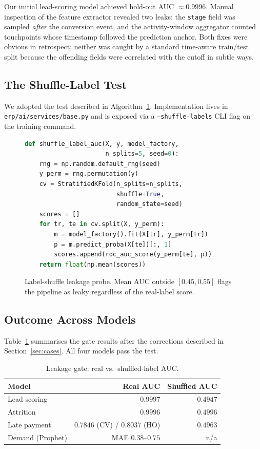 \documentclass[conference]{IEEEtran}
\begin{document}
Our initial lead-scoring model achieved hold-out AUC $\approx 0.9996$. Manual
inspection of the feature extractor revealed two leaks: the \texttt{stage}
field was sampled \emph{after} the conversion event, and the activity-window
aggregator counted touchpoints whose timestamp followed the prediction
anchor. Both fixes were obvious in retrospect; neither was caught by a
standard time-aware train/test split because the offending fields were
correlated with the cutoff in subtle ways.

\subsection{The Shuffle-Label Test}

We adopted the test described in Algorithm~\ref{alg:shuffle}.
Implementation lives in \texttt{erp/ai/services/base.py} and is exposed via a
\texttt{--shuffle-labels} CLI flag on the training command.

\begin{figure}[h]
\begin{lstlisting}[language=Python]
def shuffle_label_auc(X, y, model_factory,
                      n_splits=5, seed=0):
    rng = np.random.default_rng(seed)
    y_perm = rng.permutation(y)
    cv = StratifiedKFold(n_splits=n_splits,
                         shuffle=True,
                         random_state=seed)
    scores = []
    for tr, te in cv.split(X, y_perm):
        m = model_factory().fit(X[tr], y_perm[tr])
        p = m.predict_proba(X[te])[:, 1]
        scores.append(roc_auc_score(y_perm[te], p))
    return float(np.mean(scores))
\end{lstlisting}
\caption{Label-shuffle leakage probe. Mean AUC outside $[0.45, 0.55]$ flags
the pipeline as leaky regardless of the real-label score.}
\label{alg:shuffle}
\end{figure}

\subsection{Outcome Across Models}

Table~\ref{tab:shuffle} summarises the gate results after the corrections
described in Section~\ref{sec:cases}. All four models pass the test.

\begin{table}[h]
\centering
\caption{Leakage gate: real vs.\ shuffled-label AUC.}
\label{tab:shuffle}
\begin{tabular}{lrr}
\toprule
\textbf{Model} & \textbf{Real AUC} & \textbf{Shuffled AUC} \\
\midrule
Lead scoring   & $0.9997$ & $0.4947$ \\
Attrition      & $0.9996$ & $0.4996$ \\
Late payment   & $0.7846$ (CV) / $0.8037$ (HO) & $0.4963$ \\
Demand (Prophet) & MAE $0.38$--$0.75$ & n/a \\
\bottomrule
\end{tabular}
\end{table}
\end{document}
